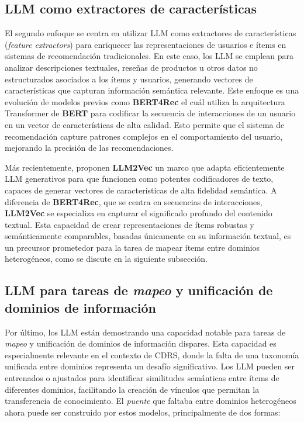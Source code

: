 	\subsection{LLM como extractores de características}
		El segundo enfoque se centra en utilizar LLM como extractores de características (\textit{feature extractors}) para enriquecer las representaciones de usuarios e ítems en sistemas de recomendación tradicionales. En este caso, los LLM se emplean para analizar descripciones textuales, reseñas de productos u otros datos no estructurados asociados a los ítems y usuarios, generando vectores de características que capturan información semántica relevante. Este enfoque es una evolución de modelos previos como \textbf{BERT4Rec} \cite{10.1145/3357384.3357895} el cuál utiliza la arquitectura Transformer de \textbf{BERT} para codificar la secuencia de interacciones de un usuario en un vector de características de alta calidad. Esto permite que el sistema de recomendación capture patrones complejos en el comportamiento del usuario, mejorando la precisión de las recomendaciones.

		Más recientemente, \cite{DBLP:journals/corr/abs-2404-05961} proponen \textbf{LLM2Vec} un marco que adapta eficientemente LLM generativos para que funcionen como potentes codificadores de texto, capaces de generar vectores de características de alta fidelidad semántica. A diferencia de \textbf{BERT4Rec}, que se centra en secuencias de interacciones, \textbf{LLM2Vec} se especializa en capturar el significado profundo del contenido textual. Esta capacidad de crear representaciones de ítems robustas y semánticamente comparables, basadas únicamente en su información textual, es un precursor prometedor para la tarea de mapear ítems entre dominios heterogéneos, como se discute en la siguiente subsección.

	\subsection{LLM para tareas de \textit{mapeo} y unificación de dominios de información}
		Por último, los LLM están demostrando una capacidad notable para tareas de \textit{mapeo} y unificación de dominios de información dispares. Esta capacidad es especialmente relevante en el contexto de CDRS, donde la falta de una taxonomía unificada entre dominios representa un desafío significativo. Los LLM pueden ser entrenados o ajustados para identificar similitudes semánticas entre ítems de diferentes dominios, facilitando la creación de vínculos que permitan la transferencia de conocimiento. El \textit{puente} que faltaba entre dominios heterogéneos ahora puede ser construido por estos modelos, principalmente de dos formas:

